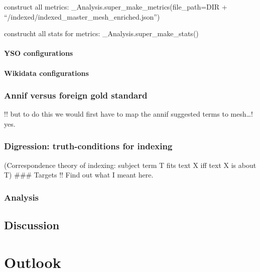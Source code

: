 construct all metrics: \_Analysis.super\_make\_metrics(file\_path=DIR +
``/indexed/indexed\_master\_mesh\_enriched.json'')

construcht all stats for metrics: \_Analysis.super\_make\_stats()

\hypertarget{yso-configurations}{%
\paragraph{YSO configurations}\label{yso-configurations}}

\hypertarget{wikidata-configurations}{%
\paragraph{Wikidata configurations}\label{wikidata-configurations}}

\hypertarget{annif-versus-foreign-gold-standard}{%
\subsubsection{Annif versus foreign gold
standard}\label{annif-versus-foreign-gold-standard}}

!! but to do this we would first have to map the annif suggested terms
to mesh\ldots! yes.

\hypertarget{digression-truth-conditions-for-indexing}{%
\subsubsection{Digression: truth-conditions for
indexing}\label{digression-truth-conditions-for-indexing}}

(Correspondence theory of indexing: subject term T fits text X iff text
X is about T) \#\#\# Targets !! Find out what I meant here.

\hypertarget{analysis-2}{%
\subsubsection{Analysis}\label{analysis-2}}

\hypertarget{discussion-1}{%
\subsection{Discussion}\label{discussion-1}}

\hypertarget{outlook}{%
\section{Outlook}\label{outlook}}

